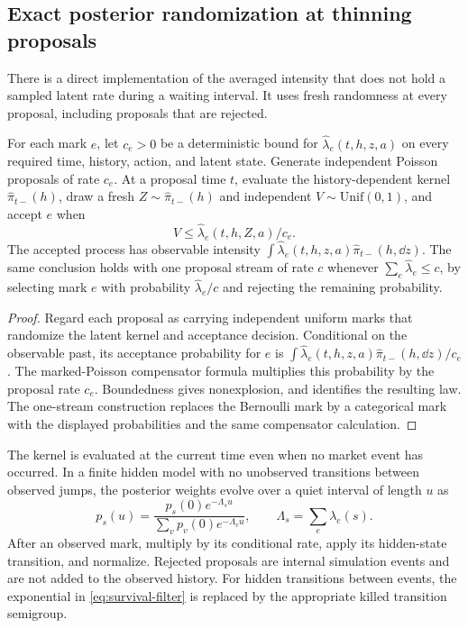 \subsection{Exact posterior randomization at thinning proposals}\label{sec:posterior-thinning}
There is a direct implementation of the averaged intensity that does not hold a sampled latent rate during a waiting interval. It uses fresh randomness at every proposal, including proposals that are rejected.

\begin{proposition}\label{prop:posterior-thinning}
For each mark $e$, let $c_e>0$ be a deterministic bound for
$\widehat\lambda_e(t,h,z,a)$ on every required time, history, action, and latent state. Generate independent Poisson proposals of rate $c_e$. At a proposal time $t$, evaluate the history-dependent kernel $\widehat\pi_{t-}(h)$, draw a fresh $Z\sim\widehat\pi_{t-}(h)$ and independent $V\sim\mathrm{Unif}(0,1)$, and accept $e$ when
\begin{equation}\label{eq:posterior-thinning}
 V\le\widehat\lambda_e(t,h,Z,a)/c_e.
\end{equation}
The accepted process has observable intensity
$\int\widehat\lambda_e(t,h,z,a)\widehat\pi_{t-}(h,\dd z)$.
The same conclusion holds with one proposal stream of rate $c$ whenever
$\sum_e\widehat\lambda_e\le c$, by selecting mark $e$ with probability
$\widehat\lambda_e/c$ and rejecting the remaining probability.
\end{proposition}
\begin{proof}
Regard each proposal as carrying independent uniform marks that randomize the latent kernel and acceptance decision. Conditional on the observable past, its acceptance probability for $e$ is
$\int\widehat\lambda_e(t,h,z,a)\widehat\pi_{t-}(h,\dd z)/c_e$.
The marked-Poisson compensator formula multiplies this probability by the proposal rate $c_e$. Boundedness gives nonexplosion, and  identifies the resulting law. The one-stream construction replaces the Bernoulli mark by a categorical mark with the displayed probabilities and the same compensator calculation.
\end{proof}

The kernel is evaluated at the current time even when no market event has occurred. In a finite hidden model with no unobserved transitions between observed jumps, the posterior weights evolve over a quiet interval of length $u$ as
\begin{equation}\label{eq:survival-filter}
 p_s(u)=\frac{p_s(0)e^{-\Lambda_su}}{\sum_vp_v(0)e^{-\Lambda_vu}},
 \qquad\Lambda_s=\sum_e\lambda_e(s).
\end{equation}
After an observed mark, multiply by its conditional rate, apply its hidden-state transition, and normalize. Rejected proposals are internal simulation events and are not added to the observed history. For hidden transitions between events, the exponential in \eqref{eq:survival-filter} is replaced by the appropriate killed transition semigroup.

